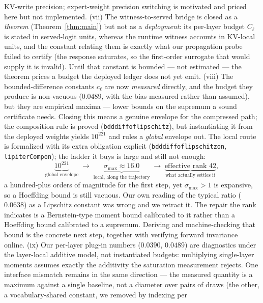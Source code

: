 \documentclass[11pt]{article}
\renewcommand{\_}{\WCorigunderscore\allowbreak}
\begin{document}
KV-write precision; expert-weight precision switching is motivated and
priced here but not implemented. (vii) The witness-to-served bridge is
closed as a \emph{theorem} (Theorem~\ref{thm:main}) but not as a
\emph{deployment}: its per-layer budget $C_\ell$ is stated in
served-logit units, whereas the runtime witness accounts in KV-local
units, and the constant relating them is exactly what our propagation
probe failed to certify (the response saturates, so the first-order
surrogate that would supply it is invalid). Until that constant is
bounded --- not estimated --- the theorem prices a budget the deployed
ledger does not yet emit. (viii) The bounded-difference constants
$c_\ell$ are now \emph{measured} directly, and the budget they produce is
non-vacuous ($0.0489$, with the bias measured rather than
assumed), but they are empirical maxima --- lower bounds on the supremum
a sound certificate needs. Closing this means a genuine envelope for the
compressed path; the composition rule is proved
(\texttt{bdd\_diff\_of\_lipschitz}), but instantiating it from the
deployed weights yields $10^{221}$ and rules a \emph{global} envelope
out. The local route is formalized with its extra obligation explicit
(\texttt{bdd\_diff\_of\_lipschitz\_on}, \texttt{lip\_iterComp\_on}); the
ladder it buys is large and still not enough:
\begin{equation}
\underbrace{10^{221}}_{\text{global envelope}}
\;\longrightarrow\;
\underbrace{\sigma_{\max}\approx16.0}_{\text{local, along the trajectory}}
\;\longrightarrow\;
\underbrace{\text{effective rank }42}_{\text{what actually settles it}} ,
\label{eq:lipladder}
\end{equation}
a hundred-plus orders of magnitude for the first step, yet
$\sigma_{\max}>1$ is expansive, so a Hoeffding bound is still vacuous. Our own reading
of the typical ratio ($0.0638$) as a Lipschitz constant was wrong and we
retract it. The repair the rank indicates is a Bernstein-type moment
bound calibrated to it rather than a Hoeffding bound calibrated to a
supremum. Deriving and machine-checking that bound is the concrete next
step, together with verifying forward invariance online. (ix) Our per-layer plug-in numbers ($0.0390$,
$0.0489$) are diagnostics under the layer-local additive model, not
instantiated budgets: multiplying single-layer moments assumes exactly
the additivity the saturation measurement rejects. One interface
mismatch remains in the same direction --- the measured quantity is a
maximum against a single baseline, not a diameter over pairs of draws
(the other, a vocabulary-shared constant, we removed by indexing per
\end{document}
